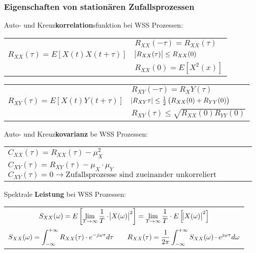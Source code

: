\documentclass[a4paper]{article}
\begin{document}
\begin{twocolumn}
\subsubsection{Eigenschaften von stationären Zufallsprozessen}

Auto- und Kreuz\textbf{korrelation}sfunktion bei WSS Prozessen:
\vspace{0.5em}

\begin{tabularx}{\columnwidth}{ZX}
   & $R_{XX}(-\tau) = R_{XX}(\tau)$ \\
   $R_{XX}(\tau) = E\left[ X(t) X(t + \tau) \right]$ &
   $\abs{R_{XX}(\tau)} \leq R_{XX}(0)$ \\
   & $R_{XX}(0) = E\left[ X^2(x) \right]$ \\
\end{tabularx}

\vspace{0.5em}

\begin{tabularx}{\columnwidth}{ZX}   
   & $R_{XY}(-\tau) = R_XY(\tau)$ \\
   $R_{XY}(\tau) = E\left[ X(t) Y(t + \tau) \right]$ &
   $\abs{R_{XY}{\tau}} \leq \frac{1}{2} \left( R_{XX}(0) + R_{YY}(0) \right)$ \\
   & $R_{XY}(\tau) \leq \sqrt{R_{XX}(0) R_{YY}(0)}$ \\
\end{tabularx}

\vspace{1em}
Auto- und Kreuz\textbf{kovarianz} be WSS Prozessen:
\vspace{0.5em}

\begin{tabularx}{\columnwidth}{Y}
  $C_{XX}(\tau) = R_{XX}(\tau) - \mu_X^2$ \\
  $C_{XY}(\tau) = R_{XY}(\tau) - \mu_X \cdot \mu_Y$
  $C_{XY}(\tau) = 0 \longrightarrow \text{Zufallsprozesse sind zueinander unkorreliert}$
\end{tabularx}

\vspace{1em}
Spektrale \textbf{Leistung} bei WSS Prozessen:
\vspace{0.5em}

\begin{tabular}{c}
  $\displaystyle S_{XX}(\omega) = E \left[ \lim_{T\rightarrow \infty} \frac{1}{T} \cdot
  \abs{X(\omega)}^2 \right] = \lim_{T\rightarrow \infty} \frac{1}{T} \cdot E\left[
  \abs{X(\omega)}^2 \right]$ \\
  $\displaystyle S_{XX}(\omega) = \int_{-\infty}^{+\infty} R_{XX}(\tau) \cdot e^{-j \omega \tau}d \tau \qquad
  R_{XX}(\tau) = \frac{1}{2\pi} \int_{-\infty}^{+\infty} S_{XX}(\omega) \cdot e^{j \omega \tau} d\omega$
\end{tabular}


\end{twocolumn}
\end{document}
